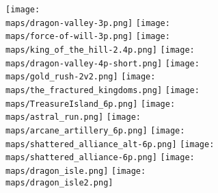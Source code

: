 
\begin{multicols*}{2}

\begin{center}
  \vfill
  \texttt{[image: \\maps/dragon-valley-3p.png]}
  \vfill
  \texttt{[image: \\maps/force-of-will-3p.png]}
  \vfill
  \texttt{[image: \\maps/king\_of\_the\_hill-2.4p.png]}
  \vfill
  \texttt{[image: \\maps/dragon-valley-4p-short.png]}
  \vfill
  \texttt{[image: \\maps/gold\_rush-2v2.png]}
  \vfill
  \texttt{[image: \\maps/the\_fractured\_kingdoms.png]}
  \vfill
  \texttt{[image: \\maps/TreasureIsland\_6p.png]}
  \vfill
  \texttt{[image: \\maps/astral\_run.png]}
  \vfill
  \texttt{[image: \\maps/arcane\_artillery\_6p.png]}
  \vfill
  \texttt{[image: \\maps/shattered\_alliance\_alt-6p.png]}
  \vfill
  \texttt{[image: \\maps/shattered\_alliance-6p.png]}
  \vfill
  \texttt{[image: \\maps/dragon\_isle.png]}
  \texttt{[image: \\maps/dragon\_isle2.png]}
  \vfill
\end{center}

\end{multicols*}


